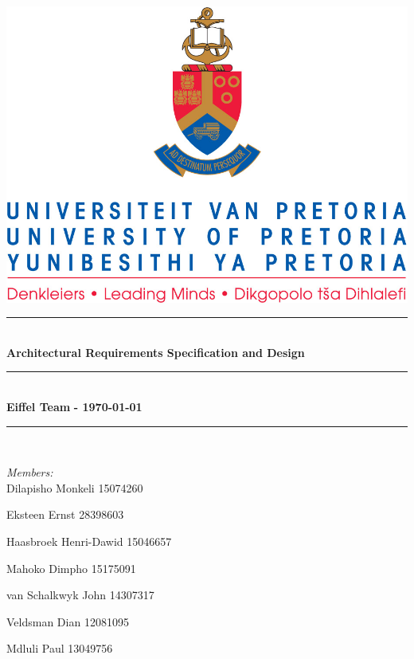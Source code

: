 \documentclass{article}
\begin{document}
	
\begin{titlepage}
	\newcommand{\HRule}{\rule{\linewidth}{0.5mm}} %

	\center %
	 

	\includegraphics[width=\textwidth]{./Images/front-page.jpg}


	\HRule \\[0.4cm]
	{ \huge \bfseries Architectural Requirements Specification and Design}\\[0.4cm] %
	\HRule \\[0.5cm]
	{ \large \bfseries Eiffel Team }%
	{\large \bfseries - \today}\\
	\HRule \\[1.5cm]

	\begin{minipage}{0.5\textwidth}
	\emph{Members:}\\%
	Dilapisho Monkeli 15074260	
	
	Eksteen Ernst 28398603
	
	Haasbroek Henri-Dawid 15046657
	
	Mahoko  Dimpho 15175091
		
	van Schalkwyk John 14307317

	Veldsman Dian 12081095

	Mdluli Paul 13049756
	\end{minipage}
\end{titlepage}
\end{document}
